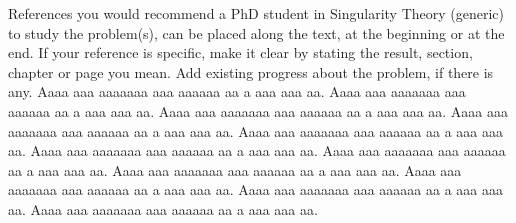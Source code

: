 \documentclass[a4paper,11pt]{amsart}
\theoremstyle{plain}
\theoremstyle{definition}
\begin{document}
References you would recommend a PhD student in Singularity Theory (generic) to study the problem(s), can be placed along the text, at the beginning or at the end. If your reference is specific, make it clear by stating the result, section, chapter or page you mean. Add existing progress about the problem, if there is any. \textcolor[rgb]{0.4,0.4,0.4}{Aaaa aaa aaaaaaa aaa aaaaaa aa a aaa aaa aa. Aaaa aaa aaaaaaa aaa aaaaaa aa a aaa aaa aa. Aaaa aaa aaaaaaa aaa aaaaaa aa a aaa aaa aa. Aaaa aaa aaaaaaa aaa aaaaaa aa a aaa aaa aa. Aaaa aaa aaaaaaa aaa aaaaaa aa a aaa aaa aa. Aaaa aaa aaaaaaa aaa aaaaaa aa a aaa aaa aa. Aaaa aaa aaaaaaa aaa aaaaaa aa a aaa aaa aa. Aaaa aaa aaaaaaa aaa aaaaaa aa a aaa aaa aa. Aaaa aaa aaaaaaa aaa aaaaaa aa a aaa aaa aa. Aaaa aaa aaaaaaa aaa aaaaaa aa a aaa aaa aa. Aaaa aaa aaaaaaa aaa aaaaaa aa a aaa aaa aa. }

%
% 

\end{document}
